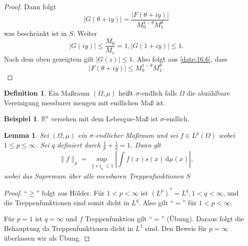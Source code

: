 \documentclass[
paper=a4,
bibtotocnumbered,
liststotocnumbered,
tablecaptionabove,
pointlessnumbers,
twoside,
openright,
10pt
]
{report}
\newtheorem{lem}[thm]{Lemma}
\theoremstyle{definition}
\newtheorem*{df}{Definition}
\newtheorem*{bsp}{Beispiel}
\numberwithin{equation}{chapter}
\begin{document}
\begin{proof}
Dann folgt
\begin{equation}\label{date:16.6}
|G(\theta+iy)| = \frac{|F(\theta + i y)|}{M_0^{1-\theta} M_1^\theta}
\end{equation}
was beschränkt ist in $S$. Weiter
\begin{equation}
|G(iy)|\le \frac{M_0}{M_e} = 1, |G(1+iy)|\le 1.
\end{equation}
Nach dem oben gezeigtem gilt $|G(z)|\le 1$. Also folgt aus \eqref{date:16.6}, dass
\begin{equation}
|F(\theta + iy)| \le M_0^{1-\theta} M_1^\theta.
\end{equation}
\end{proof}

\begin{df}
Ein Maßraum $(\Omega, \mu)$ heißt $\sigma$-endlich falls $\Omega$ die abzählbare Vereinigung messbarer mengen mit endlichen Maß ist.
\end{df}
\begin{bsp}
$\mathbb R^n$ versehen mit dem Lebesgue-Maß ist $\sigma$-endlich.
\end{bsp}

\begin{lem}\label{lm2}
Sei $(\Omega, \mu)$ ein $\sigma$-endlicher Maßraum und sei $f\in L^p(\Omega)$ wobei $1\le p \le \infty$.  Sei $q$ definiert durch $\frac{1}{p}+\frac{1}{q} =1$. Dann glt
\begin{equation}
\| f\|_p = \sup_{\| s\|_q \le 1} \left | \int f(x) s(x) \, \mathrm d\mu(x)\right |,
\end{equation}
wobei das Supremum über alle messbaren Treppenfunktionen $S$
\end{lem}
\begin{proof}
``$\ge$'' folgt aus Hölder. Für $1<p<\infty$ ist $(L^p)^*=L^q, 1 <q<\infty$, und die Treppenfunktionen sind somit dicht in $L^q$. Also gilt ``$=$'' für $1<p<\infty$.

Für $p=1$ ist $q=\infty$ und $f$ Treppenfunktion gilt ``$=$''  (Übung). Daraus folgt die Behauptung da Treppenfunktionen dicht in $L^1$ sind.  Den Beweis für $p=\infty$ überlassen wir als Übung.
\end{proof}
\end{document}
